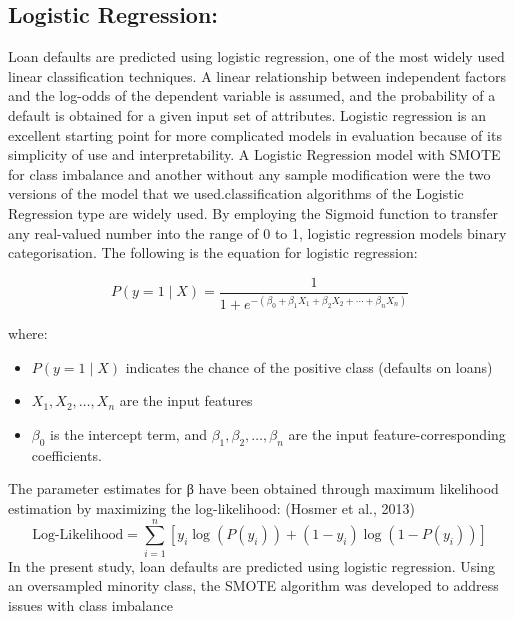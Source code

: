 \documentclass[12pt, a4paper,oneside]{book}
\numberwithin{equation}{section}
\begin{document}
\subsection{Logistic Regression:}
Loan defaults are predicted using logistic regression, one of the most widely used linear classification techniques. A linear relationship between independent factors and the log-odds of the dependent variable is assumed, and the probability of a default is obtained for a given input set of attributes. Logistic regression is an excellent starting point for more complicated models in evaluation because of its simplicity of use and interpretability. A Logistic Regression model with SMOTE for class imbalance and another without any sample modification were the two versions of the model that we used.classification algorithms of the Logistic Regression type are widely used. By employing the Sigmoid function to transfer any real-valued number into the range of 0 to 1, logistic regression models binary categorisation. The following is the equation for logistic regression:

\[P(y=1 \mid X) = \frac{1}{1 + e^{-(\beta_0 + \beta_1 X_1 + \beta_2 X_2 + \cdots + \beta_n X_n)}}\]

where:
\begin{itemize}
    \item $P(y=1 \mid X)$ indicates the chance of the positive class (defaults on loans)
    \item $X_1, X_2, \ldots, X_n$ are the input features
    \item $\beta_0$ is the intercept term, and $\beta_1, \beta_2, \ldots, \beta_n$ are the input feature-corresponding coefficients.
\end{itemize}

The parameter estimates for β have been obtained through maximum likelihood estimation by maximizing the log-likelihood: (Hosmer et al., 2013)
\[\text{Log-Likelihood} = \sum_{i=1}^{n} \left[ y_i \log(P(y_i)) + (1 - y_i) \log(1 - P(y_i)) \right]\]
In the present study, loan defaults are predicted using logistic regression. Using an oversampled minority class, the SMOTE algorithm was developed to address issues with class imbalance \cite{chawla2002smote}
\end{document}

